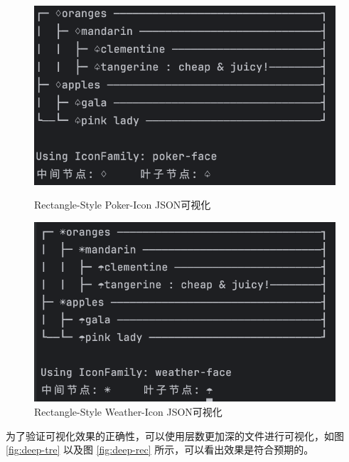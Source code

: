 \documentclass[hyperref,a4paper,UTF8]{ctexart}
\begin{document}
\begin{figure}[htbp]
\centering
\begin{minipage}[t]{0.48\textwidth}
    \centering
    \includegraphics[width=\textwidth]{figures/rec-pok.png}
    \caption{Rectangle-Style Poker-Icon JSON可视化}
    \label{fig:rec-pok}
\end{minipage}
\hfill
\begin{minipage}[t]{0.48\textwidth}
    \centering
    \includegraphics[width=\textwidth]{figures/rec-wea.png}
    \caption{Rectangle-Style Weather-Icon JSON可视化}
    \label{fig:rec-wea}
\end{minipage}
\end{figure}


为了验证可视化效果的正确性，可以使用层数更加深的文件进行可视化，如图 \ref{fig:deep-tre} 以及图 \ref{fig:deep-rec} 所示，可以看出效果是符合预期的。
\end{document}
